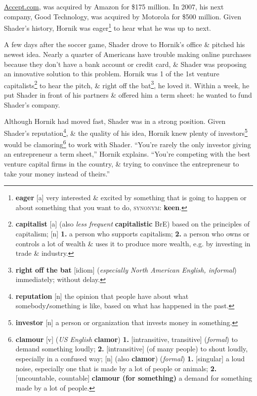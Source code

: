 \documentclass[oneside]{book}
\numberwithin{equation}{section}
\begin{document}
\url{Accept.com}, was acquired by Amazon for \$175 million. In 2007, his next company, Good Technology, was acquired by Motorola for \$500 million. Given Shader's history, Hornik was eager\footnote{\textbf{eager} [a] very interested \& excited by something that is going to happen or about something that you want to do, \textsc{synonym}: \textbf{keen}.} to hear what he was up to next.

A few days after the soccer game, Shader drove to Hornik's office \& pitched his newest idea. Nearly a quarter of Americans have trouble making online purchases because they don't have a bank account or credit card, \& Shader was proposing an innovative solution to this problem. Hornik was 1 of the 1st venture capitalists\footnote{\textbf{capitalist} [a] (also \textit{less frequent} \textbf{capitalistic} BrE) based on the principles of capitalism; [n] \textbf{1.} a person who supports capitalism; \textbf{2.} a person who owns or controls a lot of wealth \& uses it to produce more wealth, e.g. by investing in trade \& industry.} to hear the pitch, \& right off the bat\footnote{\textbf{right off the bat} [idiom] (\textit{especially North American English, informal}) immediately; without delay.}, he loved it. Within a week, he put Shader in front of his partners \& offered him a term sheet: he wanted to fund Shader's company.

Although Hornik had moved fast, Shader was in a strong position. Given Shader's reputation\footnote{\textbf{reputation} [n] the opinion that people have about what somebody\texttt{/}something is like, based on what has happened in the past.}, \& the quality of his idea, Hornik knew plenty of investors\footnote{\textbf{investor} [n] a person or organization that invests money in something.} would be clamoring\footnote{\textbf{clamour} [v] (\textit{US English} \textbf{clamor})  \textbf{1.} [intransitive, transitive] (\textit{formal}) to demand something loudly; \textbf{2.} [intransitive] (of many people) to shout loudly, especially in a confused way; [n] (also \textbf{clamor}) (\textit{formal}) \textbf{1.} [singular] a loud noise, especially one that is made by a lot of people or animals; \textbf{2.} [uncountable, countable] \textbf{clamour (for something)} a demand for something made by a lot of people.} to work with Shader. ``You're rarely the only investor giving an entrepreneur a term sheet,'' Hornik explains. ``You're competing with the best venture capital firms in the country, \& trying to convince the entrepreneur to take your money instead of theirs.''
\end{document}
